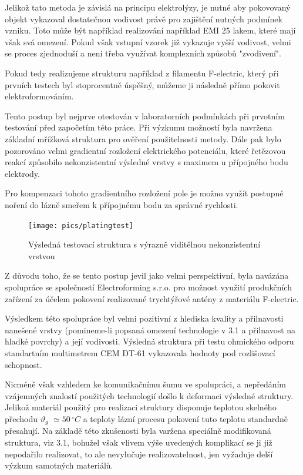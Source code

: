 Jelikož tato metoda je závislá na principu elektrolýzy, je nutné aby pokovovaný objekt vykazoval dostatečnou vodivost právě pro zajištění nutných podmínek vzniku. Toto může být například realizování například EMI 25 lakem, které mají však svá omezení. Pokud však vstupní vzorek již vykazuje vyšší vodivost, velmi se proces zjednoduší a není třeba využívat komplexních způsobů "zvodivení".

Pokud tedy realizujeme strukturu například z filamentu F-electric, který při prvních testech byl stoprocentně úspěšný, můžeme ji následně přímo pokovit elektroformováním.

Tento postup byl nejprve otestován v laboratorních podmínkách při prvotním testování před započetím této práce. Při výzkumu možností byla navržena základní mřížková struktura pro ověření použitelnosti metody. Dále pak bylo pozorováno velmi gradientní rozložení elektrického potenciálu, které řetězovou reakcí způsobilo nekonzistentní výsledné vrstvy s maximem u přípojného bodu elektrody.

Pro kompenzaci tohoto gradientního rozložení pole je možno využít postupné noření do lázně smeřem k přípojnému bodu za správné rychlosti.
\begin{figure}[!htbp]
\begin{center}
\texttt{[image: pics/platingtest]}
\caption{Výsledná testovací struktura s výrazně viditělnou nekonzistentní vrstvou}
\label{fig:platingtest}
\end{center}
\end{figure}

Z důvodu toho, že se tento postup jevil jako velmi perspektivní, byla navázána spolupráce se společností Electroforming s.r.o. pro možnost využití produkčních zařízení za účelem pokovení realizované trychtýřové antény z materiálu F-electric.

Výsledkem této spolupráce byl velmi pozitivní z hlediska kvality a přilnavosti nanešené vrstvy (pomineme-li popsaná omezení technologie v 3.1 a přilnavost na hladké povrchy) a její vodivosti. Výsledná struktura při testu ohmického odporu standartním multimetrem CEM DT-61 vykazovala hodnoty pod rozlišovací schopnost.

Nicméně však vzhledem ke komunikačnímu šumu ve spolupráci, a nepředáním vzájemných znalostí použitých technologií došlo k deformaci výsledné struktury. Jelikož materiál použitý pro realizaci struktury disponuje teplotou skelného přechodu $\vartheta_g$ $\simeq 50\,^\circ$$C$ a teploty lázní procesu pokovení tuto teplotu standardně přesahují. Na základě této zkušenosti byla varžena speciálně modifikovaná struktura, viz 3.1, bohužel však vlivem výše uvedených komplikací se ji již nepodařilo realizovat, to ale nevylučuje realizovatelnost, jen vyžaduje delší výzkum samotných materiálů.


